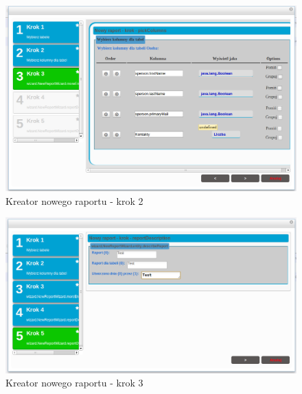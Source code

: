 		\begin{figure}[h]
			\centering
			\includegraphics[width=1.0\textwidth]{images/rbuilder_step2}
			\caption[Kreator nowego raportu - krok 2]{
				Kreator nowego raportu - krok 2
			}
			\label{app:wizard_newReport_step2}
		\end{figure}		
		\begin{figure}[h]
			\centering
			\includegraphics[width=1.0\textwidth]{images/rbuilder_step3}
			\caption[Kreator nowego raportu - krok 3]{
				Kreator nowego raportu - krok 3
			}
			\label{app:wizard_newReport_step2}
		\end{figure}	
		

